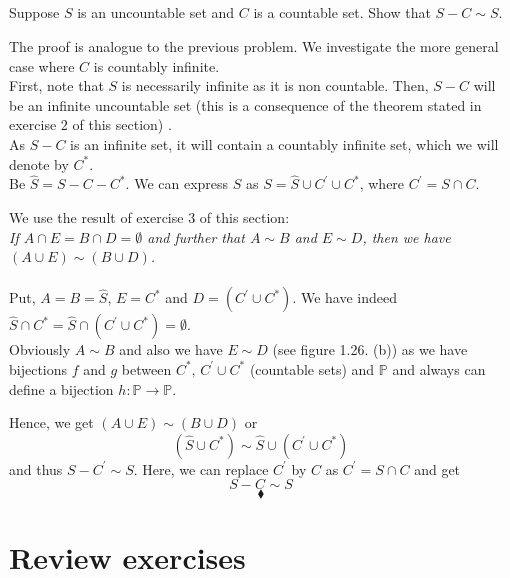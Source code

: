 \subsection{}
\begin{tcolorbox}
Suppose $S$ is an uncountable set and $C$ is a countable set. Show that $S - C\sim S$. 
\end{tcolorbox}

The proof is analogue to the previous problem. 
We investigate the more general case where $C$ is countably infinite.\\
First, note that $S$ is necessarily infinite as it is non countable. Then, $S - C$ will be an infinite uncountable set (this is a consequence of the theorem stated in exercise $2$ of this section) . \\
As $S - C$ is an  infinite set, it will contain a countably infinite set, which we will denote by $C^*$. \\
Be $\hat{S}= S-C-C^{*}$. We can express $S$ as $S=\hat{S}\cup C^{'}\cup C^{*}$, where $C^{'}= S\cap C$.

\begin{figure}[H]%
    \centering
    \subfloat[$\hat{S}= S-C-C^{*}$]{}
\label{fig:fig_p3}
\end{figure}
We use the result of exercise $3$ of this section:\\
\textit{If $A \cap E = B\cap D=\emptyset$ and further that $A\sim  B$ and $E\sim  D$, then we have  $(A \cup E) \sim (B\cup  D)$.\\}\\
Put, $A= B=\hat{S}$, $ E= C^{*}$ and $D=  (C^{'}\cup C^*)$. We have indeed $\hat{S}\cap C^*= \hat{S}\cap (C^{'}\cup C^*)=\emptyset$.\\
Obviously $A\sim B$ and also we have $E\sim D$ (see figure 1.26. (b)) as we have bijections $f$ and $g$ between $C^*,\,  C^{'}\cup C^*$ (countable sets) and $\mathbb{P}$ and always can define a bijection $h:\mathbb{P}\rightarrow \mathbb{P}$.

Hence, we get $(A \cup E) \sim (B\cup  D)$ or
$$(\hat{S} \cup C^{*}) \sim \hat{S}\cup  (C^{'}\cup C^*)$$
and thus $S-C^{'} \sim S$. Here, we can replace $C^{'}$ by $C$ as $C^{'}= S\cap C$ and get 
$$S-C^{} \sim S$$
$$\blacklozenge$$

\newpage
\setcounter{section}{28}
 \section{Review exercises}
 \renewcommand{\thesubsection}{\thesection.\RomanNumeralCaps{1}}
